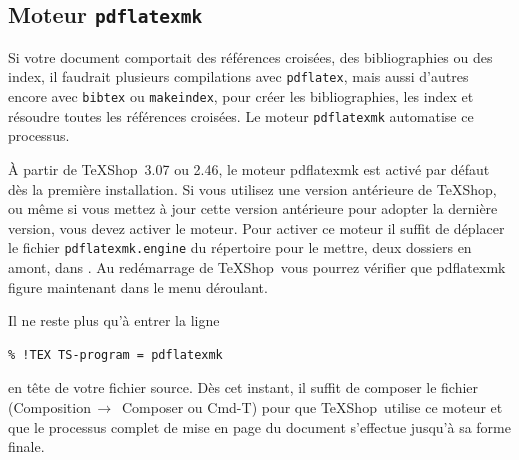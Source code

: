 \documentclass[11pt,french]{article}
\newcommand{\TS}{\textsf{\TeX Shop}}
\newcommand{\cmd}[1]{\textsf{#1}}
\newcommand{\mnu}[1]{\textsf{#1}}
\newcommand{\To}{\,\(\to\)\,}
\begin{document}
\subsection{Moteur \texttt{pdflatexmk}}

%

Si votre document comportait des références croisées, des bibliographies ou des index, il faudrait plusieurs compilations avec \texttt{pdflatex}, mais aussi d'autres encore avec \texttt{bibtex} ou \texttt{makeindex}, pour créer les bibliographies, les index et résoudre toutes les références croisées. Le moteur \texttt{pdflatexmk} automatise ce processus.


À partir de \TS\ 3.07 ou 2.46, le moteur pdflatexmk est activé par défaut dès la première installation. Si vous utilisez une version antérieure de \TS, ou même si vous mettez à jour cette version antérieure pour adopter la dernière version, vous devez activer le moteur. Pour activer ce moteur il suffit de déplacer le fichier \texttt{pdflatexmk.engine} du répertoire  pour le mettre, deux dossiers en amont, dans . Au redémarrage de \TS\ vous pourrez vérifier que \cmd{pdflatexmk} figure maintenant dans le menu déroulant.

Il ne reste plus qu'à entrer la ligne
\begin{verbatim}
% !TEX TS-program = pdflatexmk
\end{verbatim}
en tête de votre fichier source. Dès cet instant, il suffit de composer le fichier (\mnu{Composition}\To{} \mnu{Composer} ou \cmd{Cmd-T}) pour que \TS\ utilise ce moteur et que le processus complet de mise en page du document s'effectue jusqu'à sa forme finale. 
\end{document}
